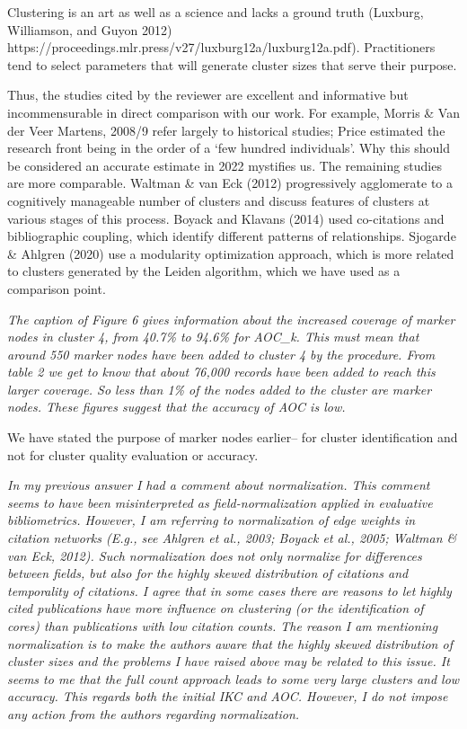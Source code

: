 \documentclass[11pt, oneside]{article}   	%
\begin{document}
Clustering is an art as well as a science and lacks a ground truth (Luxburg, Williamson, and Guyon 2012) 
https://proceedings.mlr.press/v27/luxburg12a/luxburg12a.pdf). Practitioners tend to select parameters that will generate cluster sizes that serve their purpose. 

Thus, the studies cited by the reviewer are excellent and informative but incommensurable in direct comparison with our work. For example, Morris \& Van der Veer Martens, 2008/9 refer largely to historical studies; Price estimated  the research front being in the order of a `few hundred individuals'. Why this should be considered an accurate estimate in 2022 mystifies us. The remaining studies are more comparable. Waltman \& van Eck (2012) progressively agglomerate to a cognitively manageable number of clusters and discuss features of clusters at various stages of this process.
Boyack and Klavans (2014) used co-citations and bibliographic coupling, which identify different patterns of relationships. Sjogarde \& Ahlgren (2020) use a modularity optimization approach, which is more related to clusters generated by the Leiden algorithm, which we have used as a comparison point. 

\vspace{2 mm} 
 \emph{The caption of Figure 6 gives information about the increased coverage of marker nodes in cluster 4, from 40.7\% to 94.6\% for AOC\_k. This must mean that around 550 marker nodes have been added to cluster 4 by the procedure. From table 2 we get to know that about 76,000 records have been added to reach this larger coverage. So less than 1\% of the nodes added to the cluster are marker nodes. These figures suggest that the accuracy of AOC is low.}
\vspace{2 mm} 

\vspace{2 mm} 
We have stated the purpose of marker nodes earlier-- for cluster identification and not for cluster quality evaluation or accuracy.

\vspace{2 mm} 
 \emph{ In my previous answer I had a comment about normalization. This comment seems to have been misinterpreted as field-normalization applied in evaluative bibliometrics. However, I am referring to normalization of edge weights in citation networks (E.g., see Ahlgren et al., 2003; Boyack et al., 2005; Waltman \& van Eck, 2012). Such normalization does not only normalize for differences between fields, but also for the highly skewed distribution of citations and temporality of citations. I agree that in some cases there are reasons to let highly cited publications have more influence on clustering (or the identification of cores) than publications with low citation counts. The reason I am mentioning normalization is to make the authors aware that the highly skewed distribution of cluster sizes and the problems I have raised above may be related to this issue. It seems to me that the full count approach leads to some very large clusters and low accuracy. This regards both the initial IKC and AOC. However, I do not impose any action from the authors regarding normalization.}
 
\end{document}

